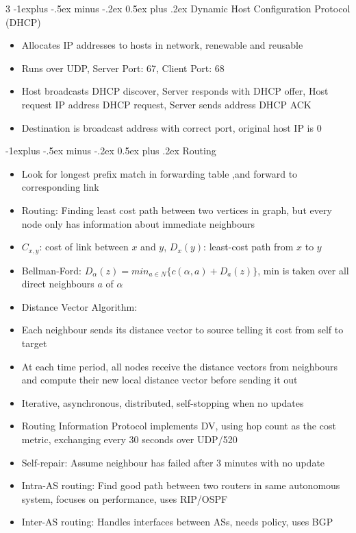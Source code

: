 \documentclass[10pt, landscape]{article}
\makeatletter
\renewcommand{\section}{\@startsection{section}{1}{0mm}%
                                {-1ex plus -.5ex minus -.2ex}%
                                {0.5ex plus .2ex}%
                                {\normalfont\large\bfseries}}
\renewcommand{\section}{\@startsection{section}{2}{0mm}%
                                {-1explus -.5ex minus -.2ex}%
                                {0.5ex plus .2ex}%
                                {\normalfont\normalsize\bfseries}}
\makeatother
\begin{document}
\begin{multicols*}{3}
\section{Dynamic Host Configuration Protocol (DHCP)}
\begin{itemize}
    \item Allocates IP addresses to hosts in network, renewable and reusable
    \item Runs over UDP, Server Port: 67, Client Port: 68
    \item Host broadcasts DHCP discover, Server responds with DHCP offer, Host request IP address DHCP request, Server sends address DHCP ACK
    \item Destination is broadcast address with correct port, original host IP is 0
\end{itemize}

\section{Routing}
\begin{itemize}
    \item Look for longest prefix match in forwarding table ,and forward to corresponding link
    \item Routing: Finding least cost path between two vertices in graph, but every node only has information about immediate neighbours
    \item $C_{x, y}$: cost of link between $x$ and $y$, $D_x(y)$: least-cost path from $x$ to $y$
    \item Bellman-Ford: $D_\alpha(z)=min_{a\in N}\{c(\alpha, a)+D_a(z)\}$, min is taken over all direct neighbours $a$ of $\alpha$
    \item Distance Vector Algorithm:
    \item Each neighbour sends its distance vector to source telling it cost from self to target
    \item At each time period, all nodes receive the distance vectors from neighbours and compute their new local distance vector before sending it out
    \item Iterative, asynchronous, distributed, self-stopping when no updates
    \item Routing Information Protocol implements DV, using hop count as the cost metric, exchanging every 30 seconds over UDP/520
    \item Self-repair: Assume neighbour has failed after 3 minutes with no update
    \item Intra-AS routing: Find good path between two routers in same autonomous system, focuses on performance, uses RIP/OSPF
    \item Inter-AS routing: Handles interfaces between ASs, needs policy, uses BGP
\end{itemize}


\end{multicols*}
\end{document}
